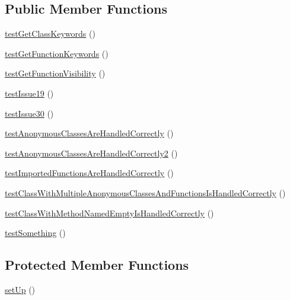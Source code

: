 \subsection*{Public Member Functions}
\begin{DoxyCompactItemize}
\item 
\mbox{\hyperlink{class_p_h_p___token___class_test_a56704532cd7d8b048e19409ca53a75d4}{test\+Get\+Class\+Keywords}} ()
\item 
\mbox{\hyperlink{class_p_h_p___token___class_test_aaccda96b7c08927d3c542dc6f4867dfd}{test\+Get\+Function\+Keywords}} ()
\item 
\mbox{\hyperlink{class_p_h_p___token___class_test_accc4eaf5c0477a630aa9e7eb3b5a66c3}{test\+Get\+Function\+Visibility}} ()
\item 
\mbox{\hyperlink{class_p_h_p___token___class_test_afc3d7a6afb30024667fbff071ee433ff}{test\+Issue19}} ()
\item 
\mbox{\hyperlink{class_p_h_p___token___class_test_abe90bed5eaa0306aeb76a65e79996f17}{test\+Issue30}} ()
\item 
\mbox{\hyperlink{class_p_h_p___token___class_test_a90c884159f92bba2c0c5dbe35b15e460}{test\+Anonymous\+Classes\+Are\+Handled\+Correctly}} ()
\item 
\mbox{\hyperlink{class_p_h_p___token___class_test_af19ae3b0f53a71f13bfb32fdb617f3d8}{test\+Anonymous\+Classes\+Are\+Handled\+Correctly2}} ()
\item 
\mbox{\hyperlink{class_p_h_p___token___class_test_ad270f5bb8a561392fd3ba28d5a8fa19b}{test\+Imported\+Functions\+Are\+Handled\+Correctly}} ()
\item 
\mbox{\hyperlink{class_p_h_p___token___class_test_afe8d42aa2f747d7836639cca77a59934}{test\+Class\+With\+Multiple\+Anonymous\+Classes\+And\+Functions\+Is\+Handled\+Correctly}} ()
\item 
\mbox{\hyperlink{class_p_h_p___token___class_test_ae7fd91a0e20c4cf6b8da853074497b1d}{test\+Class\+With\+Method\+Named\+Empty\+Is\+Handled\+Correctly}} ()
\item 
\mbox{\hyperlink{class_p_h_p___token___class_test_a0fc4e17369bc9607ebdd850d9eda8167}{test\+Something}} ()
\end{DoxyCompactItemize}
\subsection*{Protected Member Functions}
\begin{DoxyCompactItemize}
\item 
\mbox{\hyperlink{class_p_h_p___token___class_test_a0bc688732d2b3b162ffebaf7812e78da}{set\+Up}} ()
\end{DoxyCompactItemize}
